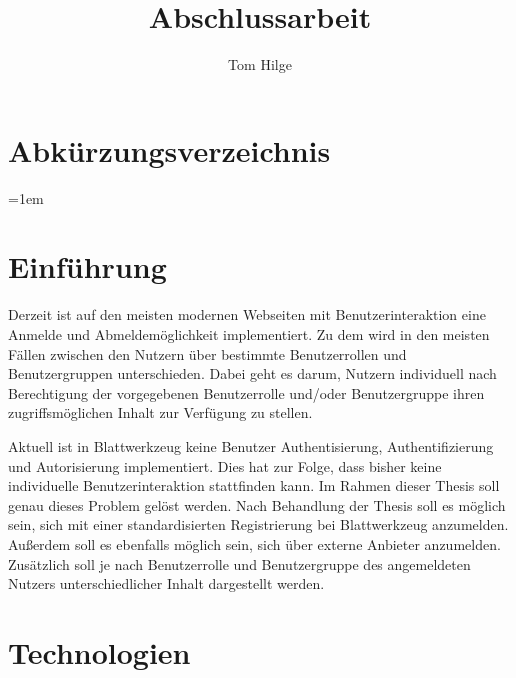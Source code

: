 \documentclass[11pt]{article}
\title{Abschlussarbeit}
\author{Tom Hilge}
\begin{document}
	
	\section{Abkürzungsverzeichnis}
	\label{sec: abbreviations}
	
	\begin{acronym}[Bash]
		\leftskip=1em
	\end{acronym}
	
	\section{Einführung}
	\label{sec:introduction}
	
	\begin{flushleft}
		Derzeit ist auf den meisten modernen Webseiten mit Benutzerinteraktion eine Anmelde und Abmeldemöglichkeit implementiert. Zu dem wird in den meisten Fällen zwischen den Nutzern über bestimmte Benutzerrollen und Benutzergruppen unterschieden. Dabei geht es darum, Nutzern individuell nach Berechtigung der vorgegebenen Benutzerrolle und/oder Benutzergruppe ihren zugriffsmöglichen Inhalt zur Verfügung zu stellen.\par\bigskip
		
		Aktuell ist in Blattwerkzeug keine Benutzer Authentisierung, Authentifizierung und Autorisierung implementiert. Dies hat zur Folge, dass bisher keine individuelle Benutzerinteraktion stattfinden kann. 
		Im Rahmen dieser Thesis soll genau dieses Problem gelöst werden. Nach Behandlung der Thesis soll es möglich sein, sich mit einer standardisierten Registrierung bei Blattwerkzeug anzumelden. Außerdem soll es ebenfalls möglich sein, sich über externe Anbieter anzumelden. Zusätzlich soll je nach Benutzerrolle und Benutzergruppe des angemeldeten Nutzers unterschiedlicher Inhalt dargestellt werden.
	\end{flushleft}


	\section{Technologien}
	\label{sec:technology}
	
\end{document}
